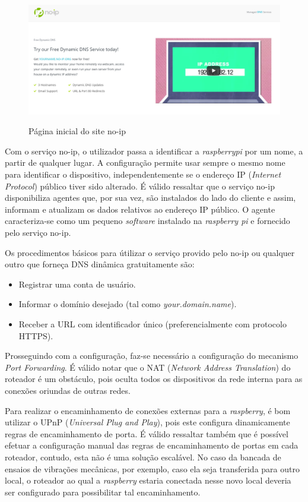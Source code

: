\begin{figure}[H]
\centering
\includegraphics[keepaspectratio=true,scale=0.35]{figuras/sitenoip.png}
\label{fig:site_no_ip}
\caption{Página inicial do site no-ip}
\end{figure}

Com o serviço no-ip, o utilizador passa a identificar a \textit{raspberrypi} por um nome, a partir de qualquer lugar. A configuração permite usar sempre o mesmo nome para identificar o dispositivo, independentemente se o endereço IP (\textit{Internet Protocol}) público tiver sido alterado. É válido ressaltar que o serviço no-ip disponibiliza agentes que, por sua vez, são instalados do lado do cliente e assim, informam e atualizam os dados relativos ao endereço IP público. O agente caracteriza-se como um pequeno \textit{software} instalado na \textit{raspberry pi} e fornecido pelo serviço no-ip.

Os procedimentos básicos para útilizar o serviço provido pelo no-ip ou qualquer outro que forneça DNS dinâmica gratuitamente são:

\begin{itemize}
  \item Registrar uma conta de usuário.
  \item Informar o domínio desejado (tal como \textit{your.domain.name}).
  \item Receber a URL com identificador único (preferencialmente com protocolo HTTPS).
\end{itemize}

Prosseguindo com a configuração, faz-se necessário a configuração do mecanismo \textit{Port Forwarding}. É válido notar que o NAT (\textit{Network Address Translation}) do roteador é um obstáculo, pois oculta todos os dispositivos da rede interna para as conexões oriundas de outras redes.

Para realizar o encaminhamento de conexões externas para a \textit{raspberry}, é bom utilizar o UPnP (\textit{Universal Plug and Play}), pois este configura dinamicamente regras de encaminhamento de porta. É válido ressaltar também que é possível efetuar a configuração manual das regras de encaminhamento de portas em cada roteador, contudo, esta não é uma solução escalável. No caso da bancada de ensaios de vibrações mecânicas, por exemplo, caso ela seja transferida para outro local, o roteador ao qual a \textit{raspberry} estaria conectada nesse novo local deveria ser configurado para possibilitar tal encaminhamento.

